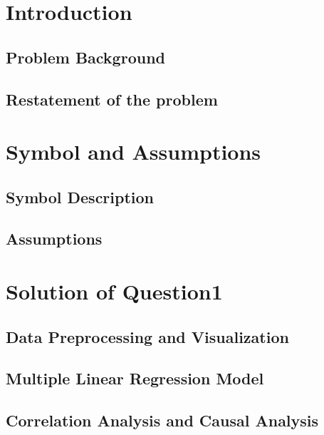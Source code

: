 \documentclass{swmcmthesis}
\title{} %
\begin{document}
\maketitle

\tableofcontents



\section{Introduction}

\subsection{Problem Background}

\subsection{Restatement of the problem}





\section{Symbol and Assumptions}
\subsection{Symbol Description}


\subsection{Assumptions}


\section{Solution of Question1}
\subsection{Data Preprocessing and Visualization}



\subsection{Multiple Linear Regression Model}


\subsection{Correlation Analysis and Causal Analysis}
\end{document}
